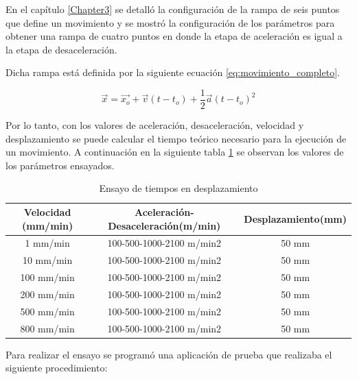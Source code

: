 En el capítulo \ref{Chapter3} se detalló la configuración de la rampa de seis puntos que define un movimiento y se mostró la configuración de los parámetros para obtener una rampa de cuatro puntos en donde la etapa de aceleración es igual a la etapa de desaceleración.

Dicha rampa está definida por la siguiente ecuación \ref{eq:movimiento_completo}.

\begin{equation}
	\label{eq:movimiento_completo}
	\vec{x}=\vec{x_o}+\vec{v}(t-t_o)+\frac12 \vec {a} (t-t_o)^2
\end{equation}

Por lo tanto, con los valores de aceleración, desaceleración, velocidad y desplazamiento se puede calcular el tiempo teórico necesario para la ejecución de un movimiento.
A continuación en la siguiente tabla \ref{tab:ensayo_comandos} se observan los valores de los parámetros ensayados.

\begin{table}[h]
	\centering
	\caption[Ensayo de tiempo en desplazamientos]{Ensayo de tiempos en desplazamiento}
	\begin{tabular}{c c c }    
		\toprule
		\textbf{Velocidad (mm/min)}     & \textbf{Aceleración-Desaceleración(m/min)} & \textbf{Desplazamiento(mm)} \\
		\midrule
		1  mm/min	 & 	   100-500-1000-2100 m/min2     & 	50 mm 			 	\\		
		10  mm/min   & 	   100-500-1000-2100 m/min2 	& 	50 mm				\\
		100  mm/min  & 	   100-500-1000-2100 m/min2	    & 	50 mm 				\\
		200  mm/min	 & 	   100-500-1000-2100 m/min2	    & 	50 mm 			\\
		500  mm/min	 & 	   100-500-1000-2100 m/min2     & 	50 mm					\\
		800  mm/min	 & 	   100-500-1000-2100 m/min2     & 	50 mm					\\
		\bottomrule
		\hline
	\end{tabular}
	\label{tab:ensayo_comandos}
\end{table}

Para realizar el ensayo se programó una aplicación de prueba que realizaba el siguiente procedimiento:

